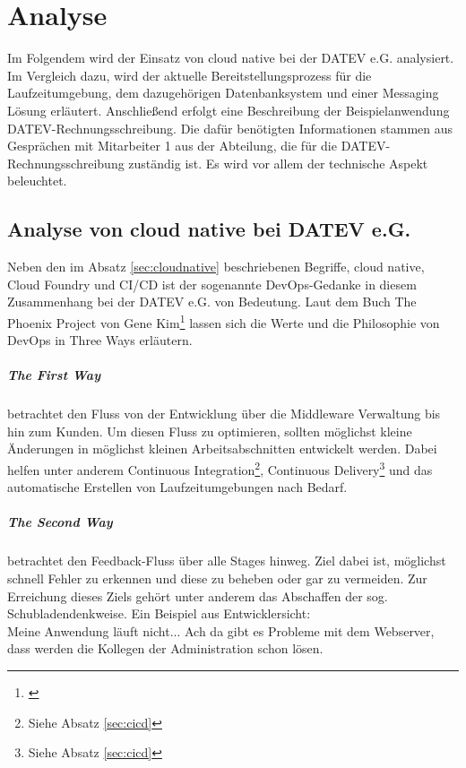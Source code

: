 \chapter{Analyse}\label{ch:analyse}
Im Folgendem wird der Einsatz von cloud native bei der DATEV e.G. analysiert.
Im Vergleich dazu, wird der aktuelle Bereitstellungsprozess für die Laufzeitumgebung, dem dazugehörigen Datenbanksystem und einer Messaging Lösung erläutert.
Anschließend erfolgt eine Beschreibung der Beispielanwendung \glqq DATEV-Rechnungsschreibung\grqq.
Die dafür benötigten Informationen stammen aus Gesprächen mit Mitarbeiter 1 aus der Abteilung, die für die DATEV-Rechnungsschreibung zuständig ist.
Es wird vor allem der technische Aspekt beleuchtet.

\section{Analyse von cloud native bei DATEV e.G.}\label{sec:analysecloud}
Neben den im Absatz \ref{sec:cloudnative} beschriebenen Begriffe, \glqq cloud native\grqq, \glqq Cloud Foundry\grqq{} und \glqq CI/CD\grqq{} ist der sogenannte \glqq DevOps\grqq-Gedanke in diesem Zusammenhang bei der DATEV e.G. von Bedeutung.
Laut dem Buch \glqq The Phoenix Project\grqq{} von Gene Kim\footnote{\cite{Kim.2014}} lassen sich die Werte und die Philosophie von DevOps in \glqq Three Ways\grqq{} erläutern.

\paragraph{\glqq The First Way\grqq} betrachtet den Fluss von der Entwicklung über die Middleware Verwaltung bis hin zum Kunden.
Um diesen Fluss zu optimieren, sollten möglichst kleine Änderungen in möglichst kleinen Arbeitsabschnitten entwickelt werden.
Dabei helfen unter anderem Continuous Integration\footnote{Siehe Absatz \ref{sec:cicd}}, Continuous Delivery\footnote{Siehe Absatz \ref{sec:cicd}} und das automatische Erstellen von Laufzeitumgebungen nach Bedarf.

\paragraph{\glqq The Second Way\grqq} betrachtet den Feedback-Fluss über alle Stages hinweg.
Ziel dabei ist, möglichst schnell Fehler zu erkennen und diese zu beheben oder gar zu vermeiden.
Zur Erreichung dieses Ziels gehört unter anderem das Abschaffen der sog. \glqq Schubladendenkweise\grqq.
Ein Beispiel aus Entwicklersicht:\\
\glqq Meine Anwendung läuft nicht... Ach da gibt es Probleme mit dem Webserver, dass werden die Kollegen der Administration schon lösen\grqq.

